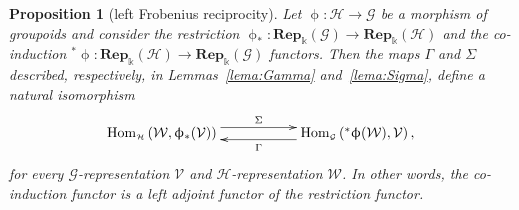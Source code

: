 \documentclass[11pt]{article}
\numberwithin{equation}{section}
\newtheorem{Proposition}[Theorem]{Proposition}
 { \theoremstyle{definition}
\newtheorem{Definition}[Theorem]{Definition}
\newtheorem{Remark}[Theorem]{Remark}
\newtheorem{Example}[Theorem]{Example}
 }
\renewcommand{\hom}[3]{\mathrm{Hom}_{\Sscript{#1}}\left(#2, #3\right)}
\newcommand{\Rep}[1]{\mathbf{Rep}_{\Sscript{\Bbbk}}(#1)}
\newcommand{\cG}{{\mathcal G}}
\newcommand{\cH}{{\mathcal H}}
\newcommand{\cV}{{\mathcal V}}
\newcommand{\cW}{{\mathcal W}}
\newcommand{\Sscript}[1]{\scriptscriptstyle{#1}}
\begin{document}
\begin{Proposition}[left Frobenius reciprocity]\label{prop:FrobeniusL} Let $\upphi\colon \cH \to \cG$ be a morphism of groupoids and consider the restriction $\upphi_{*}\colon \Rep{\cG} \to \Rep{\cH}$ and the co-induction ${}^{*}\upphi\colon \Rep{\cH} \to \Rep{\cG}$ functors. Then the maps $\Gamma$ and $\Sigma$ described, respectively, in Lemmas~{\rm \ref{lema:Gamma}} and~{\rm \ref{lema:Sigma}}, define a natural isomorphism
\begin{gather*}
\xymatrix@R=0pt{ \hom{\cH}{\cW}{\upphi_{*}(\cV)}
\ar@<1ex>@{->}^-{\Sigma}[rr] & & \hom{\cG}{{}^*\upphi(\cW)}{\cV},
\ar@<1ex>@{->}^-{\Gamma}[ll] }
\end{gather*}
for every $\cG$-representation $\cV$ and $\cH$-representation $\cW$. In other words, the co-induction functor is a left adjoint functor of the restriction functor.
\end{Proposition}
\end{document}

